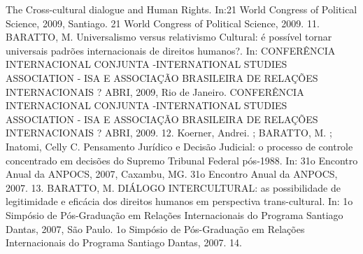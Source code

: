 \begin{cvhonors}
    {The Cross-cultural dialogue and Human Rights. In:21 World Congress of Political Science, 2009, Santiago. 21 World Congress of Political Science, 2009.}
    {}
    {11. }
  \cvhonor
    {BARATTO, M.}
    {Universalismo versus relativismo Cultural: é possível tornar universais padrões internacionais de direitos humanos?. In: CONFERÊNCIA INTERNACIONAL CONJUNTA -INTERNATIONAL STUDIES ASSOCIATION - ISA E ASSOCIAÇÃO BRASILEIRA DE RELAÇÕES INTERNACIONAIS ? ABRI, 2009, Rio de Janeiro. CONFERÊNCIA INTERNACIONAL CONJUNTA -INTERNATIONAL STUDIES ASSOCIATION - ISA E ASSOCIAÇÃO BRASILEIRA DE RELAÇÕES INTERNACIONAIS ? ABRI, 2009.}
    {}
    {12. }
  \cvhonor
    {Koerner, Andrei. ; BARATTO, M. ; Inatomi, Celly C.}
    {Pensamento Jurídico e Decisão Judicial: o processo de controle
    concentrado em decisões do Supremo Tribunal Federal pós-1988. In: 31o Encontro Anual da ANPOCS, 2007, Caxambu,
    MG. 31o Encontro Anual da ANPOCS, 2007.}
    {}
    {13. }
  \cvhonor
    {BARATTO, M.}
    {DIÁLOGO INTERCULTURAL: as possibilidade de legitimidade e eficácia dos direitos humanos em perspectiva trans-cultural. In: 1o Simpósio de Pós-Graduação em Relações Internacionais do Programa Santiago Dantas, 2007, São Paulo. 1o Simpósio de Pós-Graduação em Relações Internacionais do Programa Santiago Dantas, 2007.}
    {}
    {14. }
\end{cvhonors}
